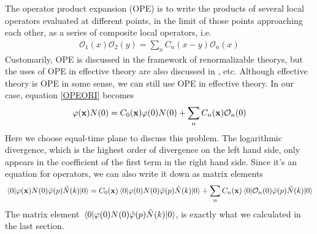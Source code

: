 \documentclass[aps,prd,preprint,showkeys,10pt]{revtex4-1}
\begin{document}
The operator product expansion\cite{Collins1984} (OPE) is to write the products of several local operators evaluated at different points, in the limit of those points approaching each other, as a series of composite local operators, i.e.
\begin{align}
	\mathcal{O}_1(x)\mathcal{O}_2(y)=\sum_nC_n(x-y)\mathcal{O}_n(x)\label{OPEORI}
\end{align}
Customarily, OPE is discussed in the framework of renormalizable theorys, but the uses of OPE in effective theory are also discussed in \cite{Broadhurst1992,Mannel1994,Kawamura2009,Kawamura2009a}, etc. Although effective theory is OPE in some sense, we can still use OPE in effective theory. In our case, equation \eqref{OPEORI} becomes
\begin{align}
	\varphi(\vb{x})N(0)=C_0(\vb{x})\varphi(0)N(0)+\sum_nC_n(\vb{x})\mathcal{O}_n(0)\label{OPE}
\end{align}
Here we choose equal-time plane to discuss this problem. The logarithmic divergence, which is the highest order of divergence on the left hand side, only appears in the coefficient of the first term in the right hand side. Since it's an equation for operators, we can also write it down as matrix elements
\begin{align}
	\mel{0}{\varphi(\vb{x})N(0)\tilde\varphi(p)\tilde N(k)}{0}=C_0(\vb{x})\mel{0}{\varphi(0)N(0)\tilde\varphi(p)\tilde N(k)}{0}+\sum_nC_n(\vb{x})\mel{0}{\mathcal{O}_n(0)\tilde\varphi(p)\tilde N(k)}{0}\label{OPEME}
\end{align}
The matrix element $\mel{0}{\varphi(0)N(0)\tilde\varphi(p)\tilde N(k)}{0}$, is exactly what we calculated in the last section.
\end{document}
